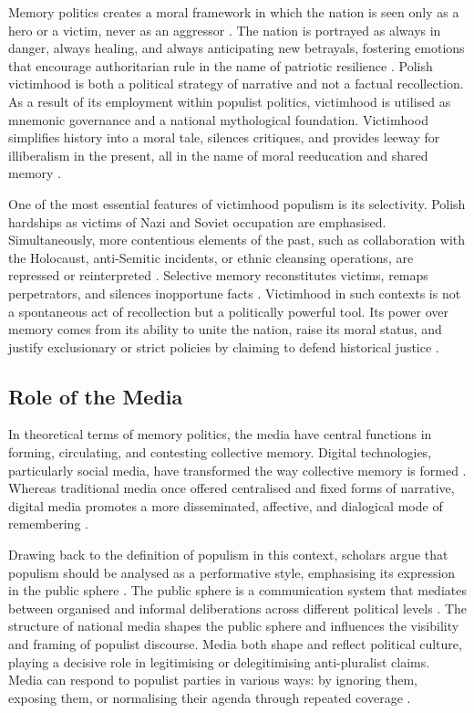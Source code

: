 Memory politics creates a moral framework in which the nation is seen only as a hero or a victim, never as an aggressor \citep{brants_transitional_2013}. The nation is portrayed as always in danger, always healing, and always anticipating new betrayals, fostering emotions that encourage authoritarian rule in the name of patriotic resilience \citep{bernhard_notitle_2014}. Polish victimhood is both a political strategy of narrative and not a factual recollection. As a result of its employment within populist politics, victimhood is utilised as mnemonic governance and a national mythological foundation. Victimhood simplifies history into a moral tale, silences critiques, and provides leeway for illiberalism in the present, all in the name of moral reeducation and shared memory \citep{meijen_populist_2024}.

One of the most essential features of victimhood populism is its selectivity. Polish hardships as victims of Nazi and Soviet occupation are emphasised. Simultaneously, more contentious elements of the past, such as collaboration with the Holocaust, anti-Semitic incidents, or ethnic cleansing operations, are repressed or reinterpreted \citep{stanczyk_commemorating_2014}. Selective memory reconstitutes victims, remaps perpetrators, and silences inopportune facts \citep{grinchenko_introduction_2018}. Victimhood in such contexts is not a spontaneous act of recollection but a politically powerful tool. Its power over memory comes from its ability to unite the nation, raise its moral status, and justify exclusionary or strict policies by claiming to defend historical justice \citep{forchtner_trajectory_2019}.

\subsection{Role of the Media}

In theoretical terms of memory politics, the media have central functions in forming, circulating, and contesting collective memory. Digital technologies, particularly social media, have transformed the way collective memory is formed \citep{assmann_transnational_2014}. Whereas traditional media once offered centralised and fixed forms of narrative, digital media promotes a more disseminated, affective, and dialogical mode of remembering \citep{woycicka_mnemonic_2024}.

Drawing back to the definition of populism in this context, scholars argue that populism should be analysed as a performative style, emphasising its expression in the public sphere \citep{moffitt_global_2016}. The public sphere is a communication system that mediates between organised and informal deliberations across different political levels \citep{habermas_political_2006}. The structure of national media shapes the public sphere and influences the visibility and framing of populist discourse. Media both shape and reflect political culture, playing a decisive role in legitimising or delegitimising anti-pluralist claims. Media can respond to populist parties in various ways: by ignoring them, exposing them, or normalising their agenda through repeated coverage \citep{crum_renewing_2020}.

